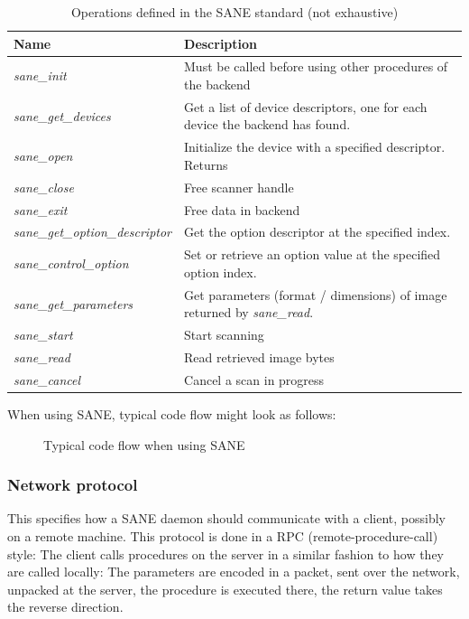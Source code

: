 \documentclass{article}
\begin{document}
\begin{table}[H]
  \caption{Operations defined in the SANE standard (not exhaustive) \cite[4.3]{sane_standard}}
  \centering
  \begin{tabularx}{\textwidth}{l | X}
    Name & Description \\ \hline
    \it sane\_init & Must be called before using other procedures of the backend \\
    \it sane\_get\_devices & Get a list of device descriptors, one for each device
                             the backend has found. \\
    \it sane\_open & Initialize the device with a specified descriptor. Returns \\
    \it sane\_close & Free scanner handle \\
    \it sane\_exit & Free data in backend \\
    \it sane\_get\_option\_descriptor & Get the option descriptor at the specified index. \\
    \it sane\_control\_option & Set or retrieve an option value at the specified option index. \\
    \it sane\_get\_parameters & Get parameters (format / dimensions) of image returned by {\it sane\_read}. \\
    \it sane\_start & Start scanning \\
    \it sane\_read & Read retrieved image bytes \\
    \it sane\_cancel & Cancel a scan in progress \\
  \end{tabularx}
\end{table}

When using SANE, typical code flow might look as follows:

\begin{figure}[H]
  \caption{Typical code flow when using SANE \cite[4.4]{sane_standard}}
  \centering
  \scalebox{1}{}
  \label{sane_codeflow}
\end{figure}

\subsubsection{Network protocol}

This specifies how a SANE daemon should communicate with a client, possibly on a
remote machine. This protocol is done in a RPC (remote-procedure-call) style:
The client calls procedures on the server in a similar fashion to how they are
called locally: The parameters are encoded in a packet, sent over the network,
unpacked at the server, the procedure is executed there, the return value takes
the reverse direction.
\end{document}
